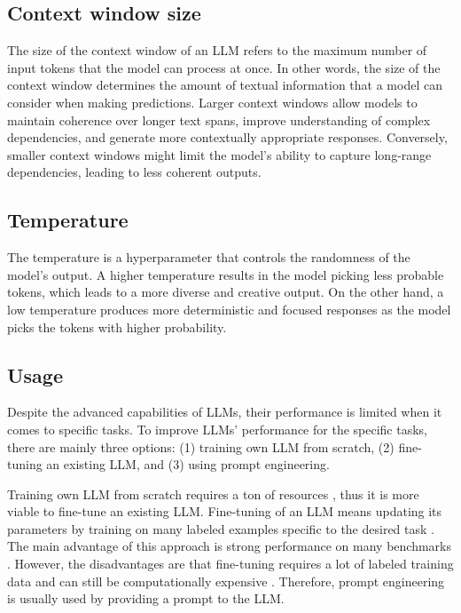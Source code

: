\subsection{Context window size}

The size of the context window of an LLM refers to the maximum number of input tokens that the model can process at once. In other words, the size of the context window determines the amount of textual information that a model can consider when making predictions. Larger context windows allow models to maintain coherence over longer text spans, improve understanding of complex dependencies, and generate more contextually appropriate responses. Conversely, smaller context windows might limit the model's ability to capture long-range dependencies, leading to less coherent outputs.


\subsection{Temperature}
\label{temperature}

The temperature is a hyperparameter that controls the randomness of the model's output. A higher temperature results in the model picking less probable tokens, which leads to a more diverse and creative output. On the other hand, a low temperature produces more deterministic and focused responses as the model picks the tokens with higher probability.


\subsection{Usage}

Despite the advanced capabilities of LLMs, their performance is limited when it comes to specific tasks. To improve LLMs' performance for the specific tasks, there are mainly three options: (1) training own LLM from scratch, (2) fine-tuning an existing LLM, and (3) using prompt engineering.

Training own LLM from scratch requires a ton of resources \cite{Zhao2023}, thus it is more viable to fine-tune an existing LLM. Fine-tuning of an LLM means updating its parameters by training on many labeled examples specific to the desired task \cite{Brown2020}. The main advantage of this approach is strong performance on many benchmarks \cite{Brown2020}. However, the disadvantages are that fine-tuning requires a lot of labeled training data and can still be computationally expensive \cite{Brown2020}. Therefore, prompt engineering is usually used by providing a prompt to the LLM.


